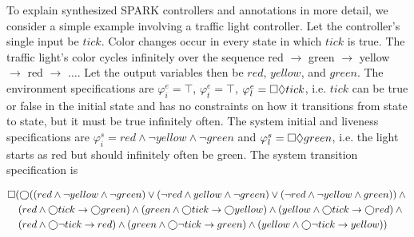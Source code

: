 \documentclass[runningheads]{llncs}
\begin{document}
To explain synthesized SPARK controllers and annotations in more detail, we consider a simple example involving a traffic light controller. 
Let the controller's single input be $tick$. 
Color changes occur in every state in which $tick$ is true.
The traffic light's color cycles infinitely over the sequence red $\rightarrow$ green $\rightarrow$ yellow $\rightarrow$ red $\rightarrow$ $\ldots$.
Let the output variables then be $red$, $yellow$, and $green$.
The environment specifications are $\varphi^e_i = \top$, $\varphi^e_t = \top$, $\varphi^e_l = \square \lozenge tick$, i.e.  
$tick$ can be true or false in the initial state and has no constraints on how it transitions from state to state, but it must be true infinitely often.
The system initial and liveness specifications are $\varphi^s_i = red \land \lnot yellow \land \lnot green$ and $\varphi^s_l =  \square \lozenge green$, i.e.
the light starts as red but should infinitely often be green. The system transition specification is

{\scriptsize
\begin{align}
\square & (\varbigcirc ( (red \land \lnot yellow \land \lnot green) \lor (\lnot red \land yellow \land \lnot green) \lor (\lnot red \land \lnot yellow \land green)) \land \mbox{}  \label{eq:mutex} \\
	& \; (red \land \varbigcirc tick \rightarrow \varbigcirc green) \land (green \land \varbigcirc tick \rightarrow \varbigcirc yellow) \land (yellow \land \varbigcirc tick \rightarrow \varbigcirc red) \land \mbox{}  \label{eq:change} \\
	& \; (red \land \varbigcirc \lnot tick \rightarrow red) \land (green \land \varbigcirc \lnot tick \rightarrow green) \land (yellow \land \varbigcirc \lnot tick \rightarrow yellow) \label{eq:same})
\end{align}
}
\end{document}
